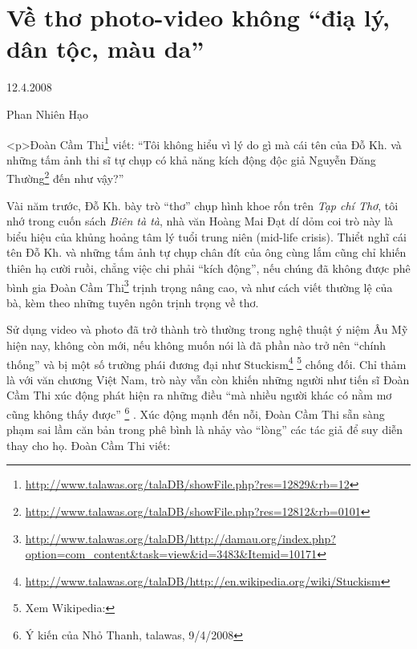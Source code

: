\documentclass[../main.tex]{subfiles}
\begin{document}
\chapter{Về thơ photo-video không “điạ lý, dân tộc, màu da”}

\begin{metadata}

\begin{flushright}12.4.2008\end{flushright}

Phan Nhiên Hạo



\end{metadata}

\begin{multicols}{2}

<p>Đoàn Cầm Thi\footnote{\url{http://www.talawas.org/talaDB/showFile.php?res=12829&rb=12}} viết: “Tôi không hiểu vì lý do gì mà cái tên của Đỗ Kh. và những tấm ảnh thi sĩ tự chụp có khả năng kích động độc giả Nguyễn Đăng Thường\footnote{\url{http://www.talawas.org/talaDB/showFile.php?res=12812&rb=0101}} đến như vậy?” 

Vài năm trước, Đỗ Kh. bày trò “thơ” chụp hình khoe rốn trên \textit{Tạp chí Thơ}, tôi nhớ trong cuốn sách \textit{Biên tà tà}, nhà văn Hoàng Mai Đạt dí dỏm coi trò này là biểu hiệu của khủng hoảng tâm lý tuổi trung niên (mid-life crisis). Thiểt nghĩ cái tên Đỗ Kh. và những tấm ảnh tự chụp chân đít của ông cùng lắm cũng chỉ khiến thiên hạ cười ruồi, chẳng việc chi phải “kích động”, nếu chúng đã không được phê bình gia Đoàn Cầm Thi\footnote{\url{http://www.talawas.org/talaDB/http://damau.org/index.php?option=com_content&task=view&id=3483&Itemid=10171}} trịnh trọng nâng cao, và như cách viết thường lệ của bà, kèm theo những tuyên ngôn trịnh trọng về thơ. 

Sử dụng video và photo đã trở thành trò thường trong nghệ thuật ý niệm Âu Mỹ hiện nay, không còn mới, nếu không muốn nói là đã phần nào trở nên “chính thống” và bị một số trường phái đương đại như Stuckism\footnote{\url{http://www.talawas.org/talaDB/http://en.wikipedia.org/wiki/Stuckism}} \footnote{
Xem Wikipedia:} chống đối. Chỉ thảm là với văn chương Việt Nam, trò này vẫn còn khiến những người như tiến sĩ Đoàn Cầm Thi xúc động phát hiện ra những điều “mà nhiều người khác có nằm mơ cũng không thấy được” \footnote{
Ý kiến của Nhỏ Thanh, talawas, 9/4/2008} . Xúc động mạnh đến nỗi, Đoàn Cầm Thi sẵn sàng phạm sai lầm căn bản trong phê bình là nhảy vào “lòng” các tác giả để suy diễn thay cho họ. Đoàn Cầm Thi viết: 


\end{multicols}
\end{document}
